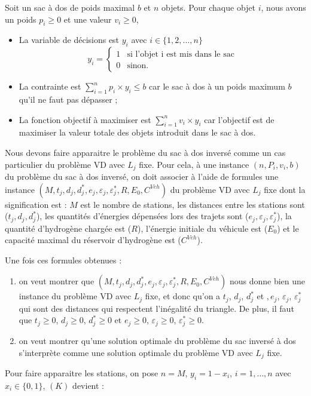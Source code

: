 Soit un sac à dos de poids maximal $b$ et $n$ objets. Pour chaque objet $i$, nous avons un poids $p_i \geq 0$ et une valeur $v_i \geq 0$,

\begin{itemize}
	
	\item La variable de décisions est $y_i$ avec $i \in \{1, 2, \dots ,n\}$
	$$
	y_i = \left\{
	\begin{array}{ll}
	1 & \mbox{si l'objet i est mis dans le sac} \\
	0 & \mbox{sinon.}
	\end{array}
	\right.
	$$
	\item La contrainte est $\sum_{i=1}^{n} p_i \times y_i \leq b$ car le sac à dos à un poids maximum $b$ qu'il ne faut pas dépasser ;
	\item La fonction objectif à maximiser est $\sum_{i=1}^{n} v_i \times y_i$ car l'objectif est de maximiser la valeur totale des objets introduit dans le sac à dos.
	
	
	
\end{itemize}
Nous devons faire apparaitre le problème du sac à dos inversé comme un cas particulier du problème VD avec $L_j$ fixe. Pour cela, à une instance $(n,P_i,v_i,b)$ du problème du sac à dos inversé, on doit associer  à l'aide de formules une instance $(M, t_j, d_j, d_j^*, e_j, \varepsilon_{j}, \varepsilon_{j}^*, R, E_0, C^{Veh})$ du problème VD avec $L_j$ fixe dont la signification est : $M$ est le nombre de stations, les distances entre les stations sont ($t_j, d_j, d_j^*$), les quantités d'énergies dépensées lors des trajets sont ($ e_j, \varepsilon_{j}, \varepsilon_{j}^*$), la quantité d'hydrogène chargée est ($R$), l'énergie initiale du véhicule est ($E_0$) et le capacité maximal du réservoir d'hydrogène est ($C^{Veh}$). 

Une fois ces formules obtenues :
\begin{enumerate}
	\item on veut montrer que $(M, t_j, d_j, d_j^*, e_j, \varepsilon_{j}, \varepsilon_{j}^*, R, E_0, C^{Veh})$ nous donne bien une instance du problème VD avec $L_j$ fixe, et donc qu'on a $t_j$, $d_j$, $d_j^*$ et $ , e_j$, $\varepsilon_{j}$, $\varepsilon_{j}^*$ qui sont des distances qui respectent l'inégalité du triangle. De plus, il faut que $t_j\geq 0$, $d_j\geq 0$, $d_j^* \geq 0$ et $e_j\geq 0$, $\varepsilon_{j}\geq 0$, $ \varepsilon_{j}^* \geq 0$.
	\item on veut montrer qu'une solution optimale du problème du sac inversé à dos s'interprète comme une solution optimale du problème VD avec $L_j$ fixe.
\end{enumerate}
Pour faire apparaitre les stations, on pose $n=M$, $y_i=1-x_i$, $i=1,\dots, n$ avec $x_i \in \{0,1\}$, $(K)$ devient :

